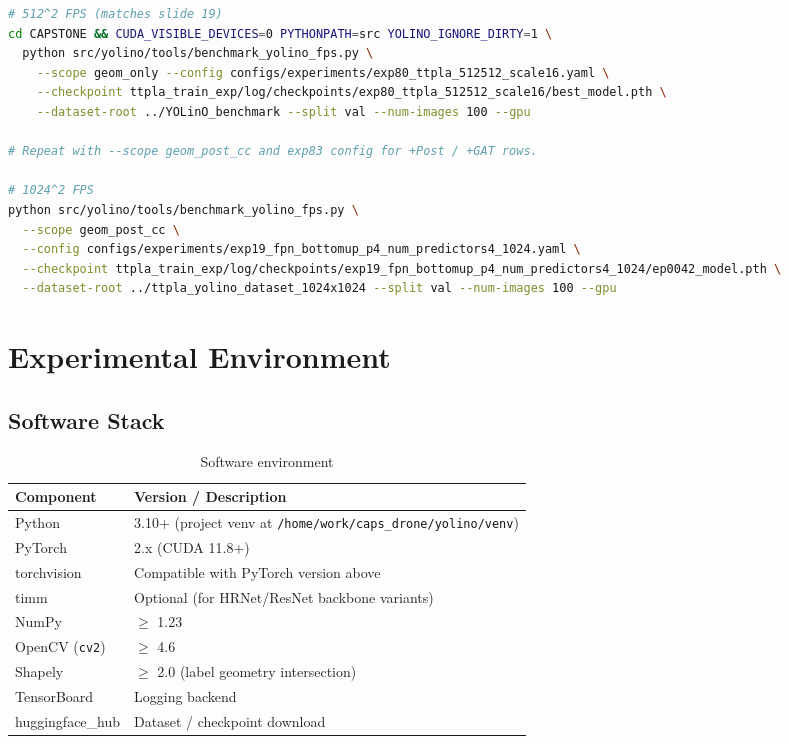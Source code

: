 \documentclass[11pt,a4paper]{article}
\begin{document}
\begin{lstlisting}[language=bash, numbers=none]
# 512^2 FPS (matches slide 19)
cd CAPSTONE && CUDA_VISIBLE_DEVICES=0 PYTHONPATH=src YOLINO_IGNORE_DIRTY=1 \
  python src/yolino/tools/benchmark_yolino_fps.py \
    --scope geom_only --config configs/experiments/exp80_ttpla_512512_scale16.yaml \
    --checkpoint ttpla_train_exp/log/checkpoints/exp80_ttpla_512512_scale16/best_model.pth \
    --dataset-root ../YOLinO_benchmark --split val --num-images 100 --gpu

# Repeat with --scope geom_post_cc and exp83 config for +Post / +GAT rows.

# 1024^2 FPS
python src/yolino/tools/benchmark_yolino_fps.py \
  --scope geom_post_cc \
  --config configs/experiments/exp19_fpn_bottomup_p4_num_predictors4_1024.yaml \
  --checkpoint ttpla_train_exp/log/checkpoints/exp19_fpn_bottomup_p4_num_predictors4_1024/ep0042_model.pth \
  --dataset-root ../ttpla_yolino_dataset_1024x1024 --split val --num-images 100 --gpu
\end{lstlisting}

\section{Experimental Environment}
\label{sec:environment}

\subsection{Software Stack}

\begin{table}[H]
\centering
\caption{Software environment}
\begin{tabular}{ll}
\toprule
Component & Version / Description \\
\midrule
Python & 3.10+ (project venv at \texttt{/home/work/caps\_drone/yolino/venv}) \\
PyTorch & 2.x (CUDA 11.8+) \\
torchvision & Compatible with PyTorch version above \\
timm & Optional (for HRNet/ResNet backbone variants) \\
NumPy & $\geq$ 1.23 \\
OpenCV (\texttt{cv2}) & $\geq$ 4.6 \\
Shapely & $\geq$ 2.0 (label geometry intersection) \\
TensorBoard & Logging backend \\
huggingface\_hub & Dataset / checkpoint download \\
\bottomrule
\end{tabular}
\end{table}
\end{document}
